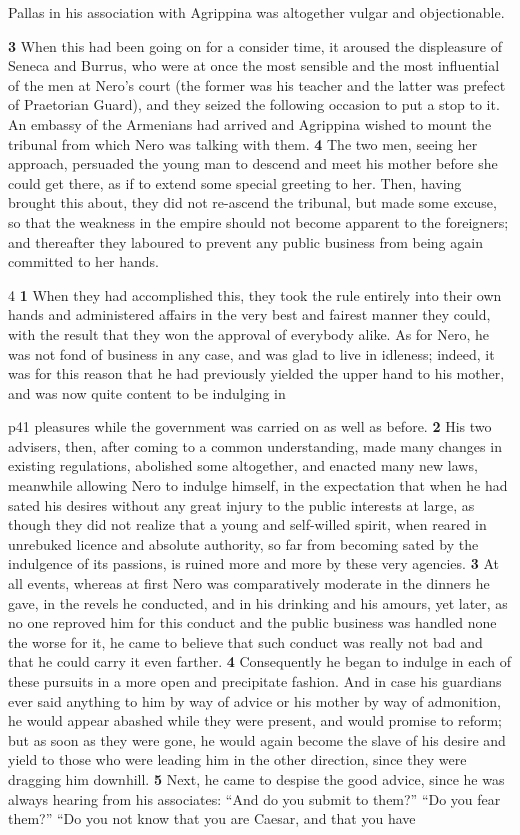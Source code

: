 Pallas in his association with Agrippina was altogether vulgar and objectionable.

\textbf{3} When this had been going on for a consider time, it aroused the displeasure of Seneca and Burrus, who were at once the most sensible and the most influential of the men at Nero's court (the former was his teacher and the latter was prefect of Praetorian Guard), and they seized the following occasion to put a stop to it. An embassy of the Armenians had arrived and Agrippina wished to mount the tribunal from which Nero was talking with them. \textbf{4} The two men, seeing her approach, persuaded the young man to descend and meet his mother before she could get there, as if to extend some special greeting to her. Then, having brought this about, they did not re-ascend the tribunal, but made some excuse, so that the weakness in the empire should not become apparent to the foreigners; and thereafter they laboured to prevent any public business from being again committed to her hands.

4 \textbf{1} When they had accomplished this, they took the rule entirely into their own hands and administered affairs in the very best and fairest manner they could, with the result that they won the approval of everybody alike. As for Nero, he was not fond of business in any case, and was glad to live in idleness; indeed, it was for this reason that he had previously yielded the upper hand to his mother, and was now quite content to be indulging in

p41 pleasures while the government was carried on as well as before. \textbf{2} His two advisers, then, after coming to a common understanding, made many changes in existing regulations, abolished some altogether, and enacted many new laws, meanwhile allowing Nero to indulge himself, in the expectation that when he had sated his desires without any great injury to the public interests at large, as though they did not realize that a young and self-willed spirit, when reared in unrebuked licence and absolute authority, so far from becoming sated by the indulgence of its passions, is ruined more and more by these very agencies. \textbf{3} At all events, whereas at first Nero was comparatively moderate in the dinners he gave, in the revels he conducted, and in his drinking and his amours, yet later, as no one reproved him for this conduct and the public business was handled none the worse for it, he came to believe that such conduct was really not bad and that he could carry it even farther. \textbf{4} Consequently he began to indulge in each of these pursuits in a more open and precipitate fashion. And in case his guardians ever said anything to him by way of advice or his mother by way of admonition, he would appear abashed while they were present, and would promise to reform; but as soon as they were gone, he would again become the slave of his desire and yield to those who were leading him in the other direction, since they were dragging him downhill. \textbf{5} Next, he came to despise the good advice, since he was always hearing from his associates: ``And do you submit to them?'' ``Do you fear them?'' ``Do you not know that you are Caesar, and that you have

